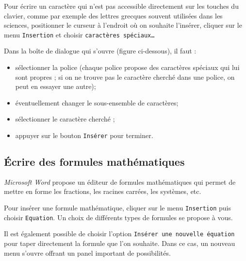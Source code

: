 Pour écrire un caractère qui n'est pas accessible directement sur les touches du clavier, comme par exemple des lettres grecques souvent utilisées dans les sciences, positionner le curseur à l'endroit où on souhaite l'insérer, cliquer sur le menu \texttt{Insertion} et choisir \texttt{caractères spéciaux…}


Dans la boîte de dialogue qui s'ouvre (figure ci-dessous), il faut :
\begin{itemize}
\item {} sélectionner la police (chaque police propose des caractères spéciaux qui lui sont propres ; si on ne trouve pas le caractère cherché dans une police, on peut en essayer une autre);
\item {} éventuellement changer le sous-ensemble de caractères;
\item {} sélectionner le caractère cherché ;
\item {} appuyer sur le bouton \texttt{Insérer} pour terminer.
\end{itemize}




\subsection{Écrire des formules mathématiques}\label{Texte3formulesMaths}

\emph{Microsoft Word} propose un éditeur de formules mathématiques qui permet de mettre en forme les fractions, les racines carrées, les systèmes, etc.

Pour insérer une formule mathématique, cliquer sur le menu \texttt{Insertion} puis choisir \texttt{Equation}. Un choix de différents types de formules se propose à vous.


Il est également possible de choisir l'option \texttt{Insérer une nouvelle équation} pour taper directement la formule que l'on souhaite. Dans ce cas, un nouveau menu s'ouvre offrant un panel important de possibilités.

